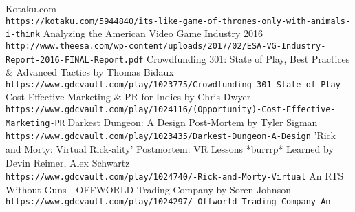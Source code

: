 \documentclass[a4paper]{article}
\begin{document}
\renewcommand{\refname}{\section{References and Further Sources}}
\begin{thebibliography}{1}


Kotaku.com
\\\texttt{https://kotaku.com/5944840/its-like-game-of-thrones-only-with-animals-i-think}
Analyzing the American Video Game Industry 2016
\\\texttt{http://www.theesa.com/wp-content/uploads/2017/02/ESA-VG-Industry-Report-2016-FINAL-Report.pdf}
Crowdfunding 301: State of Play, Best Practices & Advanced Tactics by Thomas Bidaux
\\\texttt{https://www.gdcvault.com/play/1023775/Crowdfunding-301-State-of-Play}
Cost Effective Marketing & PR for Indies by Chris Dwyer
\\\texttt{https://www.gdcvault.com/play/1024116/(Opportunity)-Cost-Effective-Marketing-PR}
Darkest Dungeon: A Design Post-Mortem by Tyler Sigman
\\\texttt{https://www.gdcvault.com/play/1023435/Darkest-Dungeon-A-Design}
'Rick and Morty: Virtual Rick-ality' Postmortem: VR Lessons *burrrp* Learned by Devin Reimer, Alex Schwartz
\\\texttt{https://www.gdcvault.com/play/1024740/-Rick-and-Morty-Virtual}
An RTS Without Guns - OFFWORLD Trading Company by Soren Johnson
\\\texttt{https://www.gdcvault.com/play/1024297/-Offworld-Trading-Company-An}
\end{thebibliography}
\end{document}
